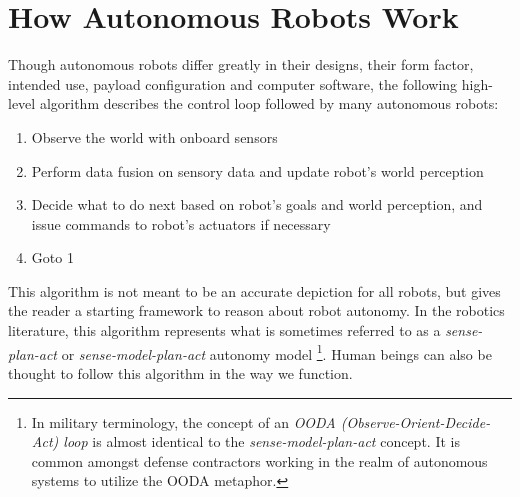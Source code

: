 



\section{How Autonomous Robots Work}
Though autonomous robots differ greatly in their designs, their form factor, intended use, payload configuration and computer software, the following high-level algorithm describes the control loop followed by many autonomous robots:

\begin{enumerate}
\item Observe the world with onboard sensors
\item Perform data fusion on sensory data and update robot's world perception
\item Decide what to do next based on robot's goals and world perception, and issue commands to robot's actuators if necessary
\item Goto 1
\end{enumerate}

This algorithm is not meant to be an accurate depiction for all robots, but gives the reader a starting framework to reason about robot autonomy. In the robotics literature, this algorithm represents what is sometimes referred to as a \textit{sense-plan-act} or \textit{sense-model-plan-act} autonomy model \citep{alami:archforautonomy, brooks:newapproach}\footnote{In military terminology, the concept of an \textit{OODA (Observe-Orient-Decide-Act) loop} \citep{boyd:ooda} is almost identical to the \textit{sense-model-plan-act} concept. It is common amongst defense contractors working in the realm of autonomous systems to utilize the OODA metaphor.}. Human beings can also be thought to follow this algorithm in the way we function. 

